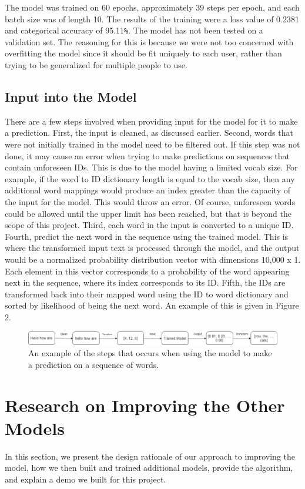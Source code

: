 \documentclass[sigconf]{acmart}
\begin{document}
The model was trained on 60 epochs, approximately 39 steps per epoch, and each batch size was of length 10. The results of the training were a loss value of 0.2381 and categorical accuracy of 95.11\lstinline{%}. The model has not been tested on a validation set. The reasoning for this is because we were not too concerned with overfitting the model since it should be fit uniquely to each user, rather than trying to be generalized for multiple people to use.
\pagestyle{plain} %
\subsection{Input into the Model}
There are a few steps involved when providing input for the model for it to make a prediction. First, the input is cleaned, as discussed earlier. Second, words that were not initially trained in the model need to be filtered out. If this step was not done, it may cause an error when trying to make predictions on sequences that contain unforeseen IDs. This is due to the model having a limited vocab size. For example, if the word to ID dictionary length is equal to the vocab size, then any additional word mappings would produce an index greater than the capacity of the input for the model. This would throw an error. Of course, unforeseen words could be allowed until the upper limit has been reached, but that is beyond the scope of this project. Third, each word in the input is converted to a unique ID. Fourth, predict the next word in the sequence using the trained model. This is where the transformed input text is processed through the model, and the output would be a normalized probability distribution vector with dimensions 10,000 x 1. Each element in this vector corresponds to a probability of the word appearing next in the sequence, where its index corresponds to its ID. Fifth, the IDs are transformed back into their mapped word using the ID to word dictionary and sorted by likelihood of being the next word. An example of this is given in Figure 2.
\begin{figure}[h]
    \centering
    \includegraphics[width=\linewidth]{figures/Input_to_Model.png}
    \caption{An example of the steps that occurs when using the model to make a prediction on a sequence of words.}
\end{figure}

\section{Research on Improving the Other Models}
In this section, we present the design rationale of our approach to improving the model, how we then built and trained additional models, provide the algorithm, and explain a demo we built for this project.
\end{document}
